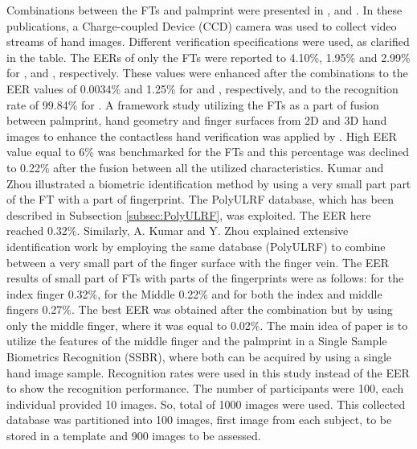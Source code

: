 \documentclass[review]{elsarticle}
\begin{document}
	Combinations between the FTs and palmprint were presented in \cite{Michael2010Robust}, \cite{michael2010innovative} and \cite{Goh2010Bi-modal}. In these publications, a Charge-coupled Device (CCD) camera was used to collect video streams of hand images. Different verification specifications were used, as clarified in the table. The EERs of only the FTs were reported to 4.10\%, 1.95\% and 2.99\% for \cite{Michael2010Robust}, \cite{michael2010innovative} and \cite{Goh2010Bi-modal}, respectively. These values were enhanced after the combinations to the EER values of 0.0034\% and 1.25\% for \cite{Michael2010Robust} and \cite{Goh2010Bi-modal}, respectively, and to the recognition rate of  99.84\% for \cite{michael2010innovative}.
	A framework study utilizing the FTs as a part of fusion between palmprint, hand geometry and finger surfaces from 2D and 3D hand images to enhance the contactless hand verification was applied by \cite{Kanhangad2011AUnified}. High EER value equal to 6\% was benchmarked for the FTs and this percentage was declined to 0.22\% after the fusion between all the utilized characteristics.
	Kumar and Zhou \cite{kumar2011contactless} illustrated a biometric identification method by using a very small part part of the FT with a part of fingerprint. The PolyULRF database, which has been described in Subsection \ref{subsec:PolyULRF}, was exploited. The EER here reached 0.32\%. Similarly, A. Kumar and Y. Zhou \cite{Kumar2012Human} explained extensive identification work by employing the same database (PolyULRF) to combine between a very small part of the finger surface with the finger vein. The EER results of small part of FTs with parts of the fingerprints were as follows: for the index finger 0.32\%, for the Middle 0.22\% and for both the index and middle fingers 0.27\%. The best EER was obtained after the combination but by using only the middle finger, where it was equal to 0.02\%.
	The main idea of \cite{zhang2012hand} paper is to utilize the features of the middle finger and the palmprint in a Single Sample Biometrics Recognition (SSBR), where both can be acquired by using a single hand image sample. Recognition rates were used in this study instead of the EER to show the recognition performance. The number of participants were 100, each individual provided 10 images. So, total of 1000 images were used. This collected database was partitioned into 100 images, first image from each subject, to be stored in a template and 900 images to be assessed. 
\end{document}

